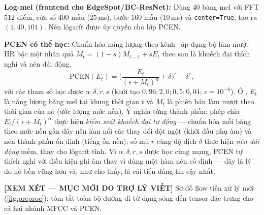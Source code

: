 \documentclass[12pt,a4paper]{report}
\newcommand{\reviewnote}[1]{%
    \par\smallskip\noindent
    \colorbox{yellow!35}{\parbox{0.97\linewidth}{\small\textbf{[XEM XÉT — MỤC MỚI DO TRỢ LÝ VIẾT]}\; #1}}%
    \par\smallskip}
\newcommand{\reviewnote}[1]{}
\newcommand{\code}[1]{\texttt{\small #1}}
\begin{document}
\textbf{Log-mel (frontend cho EdgeSpot/BC-ResNet):} Dùng 40 băng mel với FFT 512
điểm, cửa sổ 400 mẫu (25\,ms), bước 160 mẫu (10\,ms) và \code{center=True}, tạo
ra $(1,40,101)$. Nén lôgarít được ủy quyền cho lớp PCEN.

\textbf{PCEN có thể học:} Chuẩn hóa năng lượng theo kênh~\cite{wang2017trainable}
áp dụng bộ làm mượt IIR bậc một nhân quả $M_t = (1-s)M_{t-1} + sE_t$ theo sau là
khuếch đại thích nghi và nén dải động,
\begin{equation}
\text{PCEN}(E_t)=\Big(\frac{E_t}{(\epsilon+M_t)^{\alpha}}+\delta\Big)^{r}-\delta^{r},
\label{eq:pcen}
\end{equation}
với các tham số học được $\alpha,\delta,r,s$ (khởi tạo $0{,}96; 2{,}0; 0{,}5;
0{,}04$; $\epsilon{=}10^{-6}$). Ở , $E_t$ là năng lượng băng mel tại
khung thời gian $t$ và $M_t$ là phiên bản làm mượt theo thời gian của nó (ước
lượng mức nền). Ý nghĩa từng thành phần: phép chia $E_t/(\epsilon+M_t)^{\alpha}$
thực hiện \emph{kiểm soát khuếch đại tự động} --- chuẩn hóa mỗi băng theo mức nền
gần đây nên làm nổi các thay đổi đột ngột (khởi đầu phụ âm) và nén thành phần ổn
định (tiếng ồn nền); số mũ $r$ cùng độ dịch $\delta$ thực hiện \emph{nén dải động}
mềm, thay cho lôgarít tĩnh. Vì $\alpha,\delta,r,s$ được học cùng mạng, PCEN tự
thích nghi với điều kiện ghi âm thay vì dùng một hàm nén cố định --- đây là lý do
nó bền vững hơn và, như  cho thấy, là cải tiến đáng tin cậy nhất.

\reviewnote{Sơ đồ flow tiền xử lý mới (\ref{fig:preproc}): tóm tắt toàn bộ đường
đi từ dạng sóng đến tensor đặc trưng cho cả hai nhánh MFCC và PCEN.}
\end{document}

